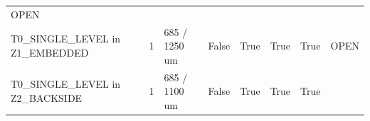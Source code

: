 \documentclass[10pt,]{article}
\begin{document}
\begin{longtable}[]{@{}llllllll@{}}
\begin{minipage}[t]{0.10\columnwidth}
OPEN\strut
\end{minipage}\tabularnewline
\begin{minipage}[t]{0.10\columnwidth}\raggedright
T0\_SINGLE\_LEVEL in Z1\_EMBEDDED\strut
\end{minipage} & \begin{minipage}[t]{0.10\columnwidth}\raggedright
1\strut
\end{minipage} & \begin{minipage}[t]{0.10\columnwidth}\raggedright
685 / 1250 um\strut
\end{minipage} & \begin{minipage}[t]{0.10\columnwidth}\raggedright
False\strut
\end{minipage} & \begin{minipage}[t]{0.10\columnwidth}\raggedright
True\strut
\end{minipage} & \begin{minipage}[t]{0.10\columnwidth}\raggedright
True\strut
\end{minipage} & \begin{minipage}[t]{0.10\columnwidth}\raggedright
True\strut
\end{minipage} & \begin{minipage}[t]{0.10\columnwidth}\raggedright
OPEN\strut
\end{minipage}\tabularnewline
\begin{minipage}[t]{0.10\columnwidth}\raggedright
T0\_SINGLE\_LEVEL in Z2\_BACKSIDE\strut
\end{minipage} & \begin{minipage}[t]{0.10\columnwidth}\raggedright
1\strut
\end{minipage} & \begin{minipage}[t]{0.10\columnwidth}\raggedright
685 / 1100 um\strut
\end{minipage} & \begin{minipage}[t]{0.10\columnwidth}\raggedright
False\strut
\end{minipage} & \begin{minipage}[t]{0.10\columnwidth}\raggedright
True\strut
\end{minipage} & \begin{minipage}[t]{0.10\columnwidth}\raggedright
True\strut
\end{minipage} & \begin{minipage}[t]{0.10\columnwidth}\raggedright
True\strut
\end{minipage} & \begin{minipage}[t]{0.10\columnwidth}\raggedright

\end{minipage}
\end{longtable}
\end{document}
